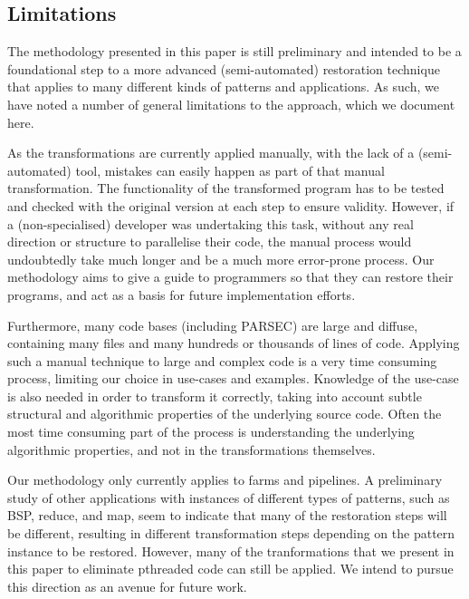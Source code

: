 \subsection{Limitations} 

The methodology presented in this paper is still preliminary and intended to be a foundational step to a more advanced (semi-automated) restoration technique that applies to many different kinds of patterns and applications. As such, we have noted a number of general limitations to the approach, which we document here.

As the transformations are currently applied manually, with the lack of a (semi-automated) tool, mistakes can easily happen as part of that manual transformation. The functionality of the transformed program has to be tested and checked with the original version at each step to ensure validity. However, if a (non-specialised) developer was undertaking this task, without any real direction or structure to parallelise their code, the manual process would undoubtedly take much longer and be a much more error-prone process. Our methodology aims to give a guide to programmers so that they can restore their programs, and act as a basis for future implementation efforts. 

Furthermore, many code bases (including PARSEC) are large and diffuse, containing many files and many hundreds or thousands of lines of code. Applying such a manual technique to large and complex code is a very time consuming process, limiting our choice in use-cases and examples. Knowledge of the use-case is also needed in order to transform it correctly, taking into account subtle structural and algorithmic properties of the underlying source code. Often the most time consuming part of the process is understanding the underlying algorithmic properties, and not in the transformations themselves. 

Our methodology only currently applies to farms and pipelines. A preliminary study of other applications with instances of different types of patterns, such as BSP, reduce, and map, seem to indicate that many of the restoration steps will be different, resulting in different transformation steps depending on the pattern instance to be restored. However, many of the tranformations that we present in this paper to eliminate pthreaded code can still be applied. We intend to pursue this direction as an avenue for future work.


